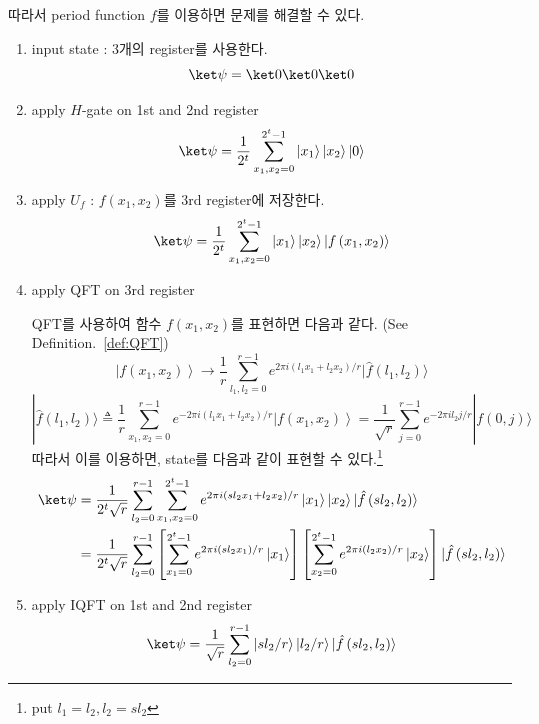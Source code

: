 따라서 period function $f$를 이용하면 문제를 해결할 수 있다. 
\begin{enumerate}
  \item input state : 3개의 register를 사용한다.
  \begin{equation*}
    \ket \psi = \ket 0 \ket 0 \ket 0
  \end{equation*}
  \item apply $H$-gate on 1st and 2nd register
  \begin{equation*}
    \ket \psi = \frac{1}{2^t} \sum_{x_1, x_2=0}^{2^t-1}\left|x_1\right\rangle\left|x_2\right\rangle|0\rangle
  \end{equation*}
  \item apply $U_f$ : $f(x_1, x_2)$를 3rd register에 저장한다.
  \begin{equation*}
    \ket \psi = \frac{1}{2^t} \sum_{x_1, x_2=0}^{2^t-1}\left|x_1\right\rangle\left|x_2\right\rangle\left|f\left(x_1, x_2\right)\right\rangle
  \end{equation*}
  \item apply QFT on 3rd register 
  
  QFT를 사용하여 함수 $f(x_1, x_2)$를 표현하면 다음과 같다. (See Definition.~\ref{def:QFT})
  \begin{equation*}
    \left|f\left(x_1, x_2\right)\right\rangle \rightarrow \frac{1}{r} \sum_{l_1, l_2=0}^{r-1} e^{2 \pi i\left(l_1 x_1+l_2 x_2\right) / r}|\hat{f}\left(l_1, l_2\right)\rangle 
  \end{equation*}
  \begin{equation*}
    |\hat{f}\left(l_1, l_2\right)\rangle \triangleq \frac{1}{r} \sum_{x_1, x_2=0}^{r-1} e^{-2 \pi i\left(l_1 x_1+l_2 x_2\right) / r}\left|f\left(x_1, x_2\right)\right\rangle=\frac{1}{\sqrt{r}} \sum_{j=0}^{r-1} e^{-2 \pi i l_2 j / r}|f(0, j)\rangle
  \end{equation*}
  따라서 이를 이용하면, state를 다음과 같이 표현할 수 있다.\footnote{put $l_1 = l_2, l_2 = sl_2$}
  \begin{align*}
    \ket \psi &= \frac{1}{2^t \sqrt{r}} \sum_{l_2=0}^{r-1} \sum_{x_1, x_2=0}^{2^t-1} e^{2 \pi i\left(s l_2 x_1+l_2 x_2\right) / r}\left|x_1\right\rangle\left|x_2\right\rangle|\hat{f}\left(s l_2, l_2\right)\rangle  \\ 
    &=\frac{1}{2^t \sqrt{r}} \sum_{l_2=0}^{r-1}\left[\sum_{x_1=0}^{2^t-1} e^{2 \pi i\left(s l_2 x_1\right) / r}\left|x_1\right\rangle\right]\left[\sum_{x_2=0}^{2^t-1} e^{2 \pi i\left(l_2 x_2\right) / r}\left|x_2\right\rangle\right]|\hat{f}\left(s l_2, l_2\right)\rangle
  \end{align*}
  \item apply IQFT on 1st and 2nd register
  \begin{equation*}
    \ket \psi = \frac{1}{\sqrt{r}} \sum_{l_2=0}^{r-1}\left|s l_2 / r\right\rangle\left|l_2 / r\right\rangle|\hat{f}\left(s l_2, l_2\right)\rangle
  \end{equation*}
\end{enumerate}

